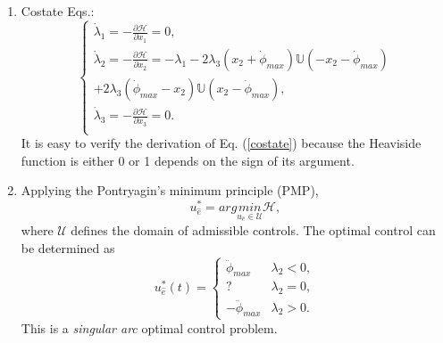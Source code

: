 \documentclass[journal ]{new-aiaa}
\begin{document}
\begin{enumerate}
		\item Costate Eqs.:
		\begin{equation}\label{costate}
		\left\{\begin{array}{l}
		\dot{\lambda}_1=-\frac{\partial{\mathscr{H}}}{\partial{x_1}}=0,\\
		\dot{\lambda}_2=-\frac{\partial{\mathscr{H}}}{\partial{x_2}}=-\lambda_1-2\lambda_3(x_2+\dot{\phi}_{max})\mathbb{U}(-x_2-\dot{\phi}_{max})\\
		+2\lambda_3(\dot{\phi}_{max}-x_2)\mathbb{U}(x_2-\dot{\phi}_{max}),\\
		\dot{\lambda}_3=-\frac{\partial{\mathscr{H}}}{\partial{x_3}}=0.\\
		\end{array}
		\right.
		\end{equation}
 It is easy to verify the derivation of Eq. (\ref{costate}) because the Heaviside function is either 0 or 1 depends on the sign of  its argument.
		\item Applying the Pontryagin's minimum principle (PMP),
		\begin{equation}
		u_{\hat{e}}^*=arg \underset{u_{\hat{e}}\in\mathcal{U}}{min} \mathscr{H},
		\end{equation}
		where $\mathcal{U}$ defines the domain of admissible controls. The optimal control can be determined as
		\begin{equation}
		u_{\hat{e}}^*(t)=\left\{
		\begin{array}{ll}
		\ddot{\phi}_{max}&\lambda_2<0,\\
		?& \lambda_2=0,\\
		-\ddot{\phi}_{max}&\lambda_2>0.
		\end{array}
		\right.
		\end{equation}
		This is a {\it singular arc} optimal control problem.
		
		

\end{enumerate}
\end{document}
